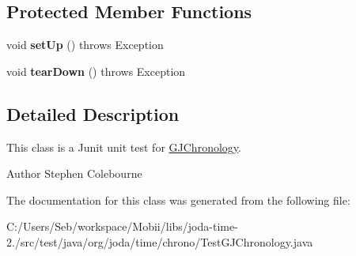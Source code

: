 \subsection*{Protected Member Functions}
\begin{DoxyCompactItemize}
\item 
\hypertarget{classorg_1_1joda_1_1time_1_1chrono_1_1_test_g_j_chronology_ae0df613dc21c8956134081e9f279e9eb}{void {\bfseries set\-Up} ()  throws Exception }\label{classorg_1_1joda_1_1time_1_1chrono_1_1_test_g_j_chronology_ae0df613dc21c8956134081e9f279e9eb}

\item 
\hypertarget{classorg_1_1joda_1_1time_1_1chrono_1_1_test_g_j_chronology_a0457f690478582d2ce87a4a5a2fbad10}{void {\bfseries tear\-Down} ()  throws Exception }\label{classorg_1_1joda_1_1time_1_1chrono_1_1_test_g_j_chronology_a0457f690478582d2ce87a4a5a2fbad10}

\end{DoxyCompactItemize}


\subsection{Detailed Description}
This class is a Junit unit test for \hyperlink{classorg_1_1joda_1_1time_1_1chrono_1_1_g_j_chronology}{G\-J\-Chronology}.

\begin{DoxyAuthor}{Author}
Stephen Colebourne 
\end{DoxyAuthor}


The documentation for this class was generated from the following file\-:\begin{DoxyCompactItemize}
\item 
C\-:/\-Users/\-Seb/workspace/\-Mobii/libs/joda-\/time-\/2./src/test/java/org/joda/time/chrono/Test\-G\-J\-Chronology.\-java\end{DoxyCompactItemize}
